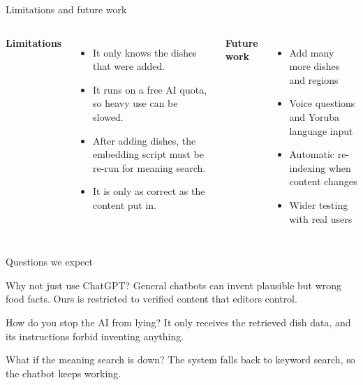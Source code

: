 \documentclass[aspectratio=169,11pt]{beamer}
\begin{document}
\begin{frame}{Limitations and future work}
  \begin{columns}[T]
      \textbf{\color{indigo}Limitations}
      \begin{itemize}
        \item It only knows the dishes that were added.
        \item It runs on a free AI quota, so heavy use can be slowed.
        \item After adding dishes, the embedding script must be re-run for meaning search.
        \item It is only as correct as the content put in.
      \end{itemize}
      \textbf{\color{indigo}Future work}
      \begin{itemize}
        \item Add many more dishes and regions
        \item Voice questions and Yoruba language input
        \item Automatic re-indexing when content changes
        \item Wider testing with real users
      \end{itemize}
  \end{columns}
\end{frame}

\begin{frame}{Questions we expect}
  \begin{block}{Why not just use ChatGPT?}
    General chatbots can invent plausible but wrong food facts. Ours is restricted to verified content that editors control.
  \end{block}
  \begin{block}{How do you stop the AI from lying?}
    It only receives the retrieved dish data, and its instructions forbid inventing anything.
  \end{block}
  \begin{block}{What if the meaning search is down?}
    The system falls back to keyword search, so the chatbot keeps working.
  \end{block}
\end{frame}
\end{document}
